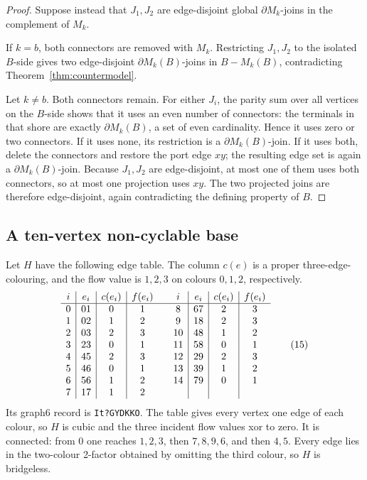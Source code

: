 \documentclass[11pt]{article}
\theoremstyle{definition}
\theoremstyle{remark}
\newcommand{\bd}{\partial}
\begin{document}
\begin{proof}
Suppose instead that \(J_1,J_2\) are edge-disjoint global
\(\bd M_k\)-joins in the complement of \(M_k\).

If \(k=b\), both connectors are removed with \(M_k\).  Restricting
\(J_1,J_2\) to the isolated \(B\)-side gives two edge-disjoint
\(\bd M_k(B)\)-joins in \(B-M_k(B)\), contradicting
Theorem~\ref{thm:countermodel}.

Let \(k\ne b\).  Both connectors remain.  For either \(J_i\), the parity
sum over all vertices on the \(B\)-side shows that it uses an even number
of connectors: the terminals in that shore are exactly
\(\bd M_k(B)\), a set of even cardinality.  Hence it uses zero or two
connectors.  If it uses none, its restriction is a
\(\bd M_k(B)\)-join.  If it uses both, delete the connectors and restore
the port edge \(xy\); the resulting edge set is again a
\(\bd M_k(B)\)-join.  Because \(J_1,J_2\) are edge-disjoint, at most one
of them uses both connectors, so at most one projection uses \(xy\).
The two projected joins are therefore edge-disjoint, again contradicting
the defining property of \(B\).
\end{proof}

\subsection{A ten-vertex non-cyclable base}

Let \(H\) have the following edge table.  The column \(c(e)\) is a proper
three-edge-colouring, and the flow value is \(1,2,3\) on colours
\(0,1,2\), respectively.
\[
\begin{array}{c|c|c|c@{\qquad}c|c|c|c}
i&e_i&c(e_i)&f(e_i)&i&e_i&c(e_i)&f(e_i)\\ \hline
0&01&0&1& 8&67&2&3\\
1&02&1&2& 9&18&2&3\\
2&03&2&3&10&48&1&2\\
3&23&0&1&11&58&0&1\\
4&45&2&3&12&29&2&3\\
5&46&0&1&13&39&1&2\\
6&56&1&2&14&79&0&1\\
7&17&1&2&&&&
\end{array}                                                       \tag{15}
\]
Its graph6 record is \texttt{It?GYDKKO}.  The table gives every vertex
one edge of each colour, so \(H\) is cubic and the three incident flow
values xor to zero.  It is connected: from \(0\) one reaches
\(1,2,3\), then \(7,8,9,6\), and then \(4,5\).  Every edge lies in the
two-colour 2-factor obtained by omitting the third colour, so \(H\) is
bridgeless.
\end{document}
